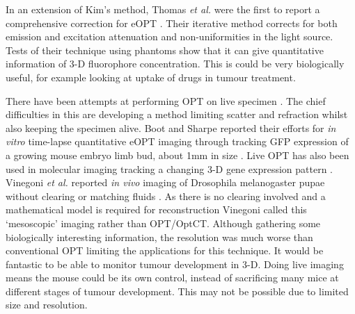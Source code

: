 \documentclass[12pt]{article}
\begin{document}
In an extension of Kim's method, Thomas \textit{et al.} were the first to report a comprehensive correction for  eOPT \cite{Thomas:2010gt}. Their iterative method corrects for both emission and excitation attenuation and non-uniformities in the light source. 
Tests of their technique using phantoms show that it can give quantitative information of 3-D fluorophore concentration. This is could be very biologically useful, for example looking at uptake of drugs in tumour treatment. 

  




There have been attempts at performing OPT  on live specimen \cite{Boot:2008dt, Vinegoni:2008ix, Colas:2009}. The chief difficulties in this are developing a method limiting scatter and refraction  whilst also keeping the specimen alive. Boot and Sharpe reported their efforts for \textit{in vitro} time-lapse quantitative eOPT  imaging through tracking GFP expression of a growing mouse embryo limb bud, about 1mm in size \cite{Boot:2008dt}. 
Live OPT has also been used in molecular imaging tracking a changing 3-D gene expression pattern \cite{Colas:2009}.
Vinegoni \textit{et al.} reported \textit{in vivo} imaging of Drosophila melanogaster pupae without clearing or matching fluids \cite{Vinegoni:2008ix}.  As there is no clearing involved and a mathematical model is required for reconstruction Vinegoni called this `mesoscopic' imaging rather than OPT/OptCT.  
Although gathering some biologically interesting information, the resolution was much worse than conventional OPT limiting the applications for this technique. It would be fantastic to be able to monitor tumour development in 3-D. Doing live imaging means the mouse could be its own control, instead of sacrificing many mice at different stages of tumour development. This may not be possible due to limited size and resolution.




\end{document}
